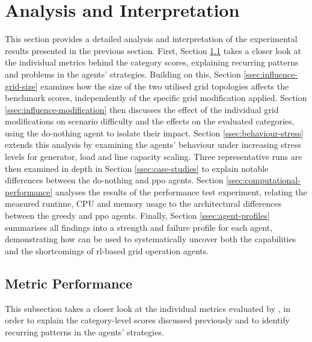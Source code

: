 \section{Analysis and Interpretation}\label{sec:exp-analysis-interpretation}
This section provides a detailed analysis and interpretation of the experimental results presented in the previous section. 
First, Section \ref{ssec:metric-performance} takes a closer look at the individual metrics behind the category scores, explaining recurring patterns and problems in the agents' strategies. 
Building on this, Section \ref{ssec:influence-grid-size} examines how the size of the two utilised grid topologies affects the benchmark scores, independently of the specific grid modification applied. 
Section \ref{ssec:influence-modification} then discusses the effect of the individual grid modifications on scenario difficulty and the effects on the evaluated categories, using the do-nothing agent to isolate their impact. 
Section \ref{ssec:behaviour-stress} extends this analysis by examining the agents' behaviour under increasing stress levels for generator, load and line capacity scaling. 
Three representative runs are then examined in depth in Section \ref{ssec:case-studies} to explain notable differences between the do-nothing and \ac{ppo} agents. 
Section \ref{ssec:computational-performance} analyses the results of the performance test experiment, relating the measured runtime, CPU and memory usage to the architectural differences between the greedy and \ac{ppo} agents. 
Finally, Section \ref{ssec:agent-profiles} summarises all findings into a strength and failure profile for each agent, demonstrating how \benchmark can be used to systematically uncover both the capabilities and the shortcomings of \ac{rl}-based grid operation agents.

\subsection{Metric Performance}\label{ssec:metric-performance}
This subsection takes a closer look at the individual metrics evaluated by \benchmark, in order to explain the category-level scores discussed previously and to identify recurring patterns in the agents' strategies.

